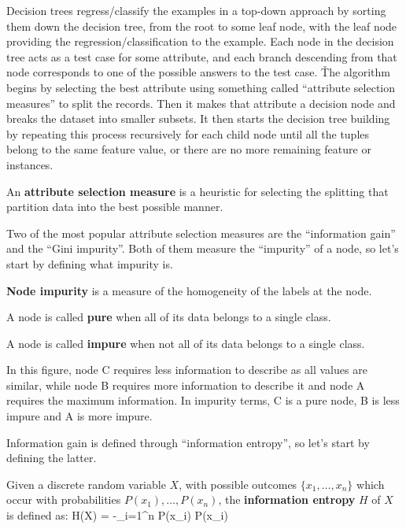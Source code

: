 
Decision trees regress/classify the examples in a top-down approach by sorting them down the decision tree, from the
root to some leaf node, with the leaf node providing the regression/classification to the example. Each node in the
decision tree acts as a test case for some attribute, and each branch descending from that node corresponds to one
of the possible answers to the test case. \v

The algorithm begins by selecting the best attribute using something called ``attribute selection measures'' to
split the records. Then it makes that attribute a decision node and breaks the dataset into smaller subsets. It then
starts the decision tree building by repeating this process recursively for each child node until all the tuples
belong to the same feature value, or there are no more remaining feature or instances.

An \textbf{attribute selection measure} is a heuristic for selecting the splitting that partition data into the best
possible manner.
\ed

Two of the most popular attribute selection measures are the ``information gain'' and the ``Gini impurity''. Both of
them measure the ``impurity'' of a node, so let's start by defining what impurity is.

\textbf{Node impurity} is a measure of the homogeneity of the labels at the node.
\ed

A node is called \textbf{pure} when all of its data belongs to a single class.
\ed

A node is called \textbf{impure} when not all of its data belongs to a single class.
\ed

\be
In this figure, node C requires less information to describe as all values are similar, while node B requires more
information to describe it and node A requires the maximum information. In impurity terms, C is a pure node, B is less
impure and A is more impure.

\ee

Information gain is defined through ``information entropy'', so let's start by defining the latter.

Given a discrete random variable $X$, with possible outcomes $\{x_{1}, \ldots, x_{n} \}$ which occur with probabilities
$P(x_{1}), \ldots, P (x_{n})$, the \textbf{information entropy} $H$ of $X$ is defined as:
\bse
H(X) = -\sum _{i=1}^{n} {P(x_{i}) \log P(x_{i})}
\ese

